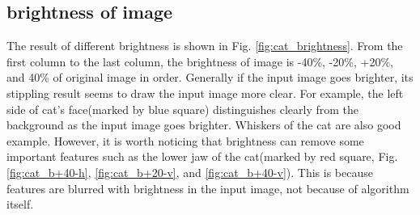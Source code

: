 \documentclass[11pt]{article}
\begin{document}
\subsection{brightness of image}
The result of different brightness is shown in Fig. \ref{fig:cat_brightness}. From the first column to the last column, the brightness of image is -40\%, -20\%, +20\%, and 40\% of original image in order. Generally if the input image goes brighter, its stippling result seems to draw the input image more clear. For example, the left side of cat's face(marked by blue square) distinguishes clearly from the background as the input image goes brighter. Whiskers of the cat are also good example. However, it is worth noticing that brightness can remove some important features such as the lower jaw of the cat(marked by red square, Fig. \ref{fig:cat_b+40-h}, \ref{fig:cat_b+20-v}, and \ref{fig:cat_b+40-v}). This is because features are blurred with brightness in the input image, not because of algorithm itself. 
\end{document}
